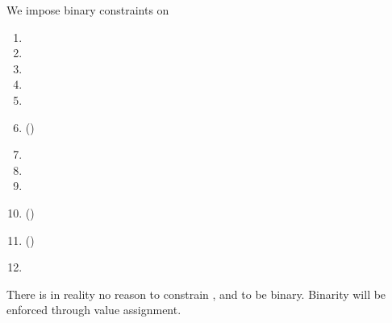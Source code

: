 We impose binary constraints on
\begin{multicols}{2}
	\begin{enumerate}
		\item \txIsLegacy{}
		\item \txIsAccessSet{}
		\item \txIsTypeTwo{}
		\item \txIsDeployment{}
		\item \txStatusCode{}
		\item \txCopyTxcd{} \quad (\trash)
		\item \txRequiresEvmExecution{}
		\item \eucFlag{}
		\item \wcpFlag{}
		\item \isLastTxOfBlock{} \quad (\trash)
		\item \txFirstTransactionInBlock{} \quad (\trash)
		\item[\vspace{\fill}]
	\end{enumerate}
\end{multicols}
\saNote{}
There is in reality no reason to constrain
\txCopyTxcd{},
\isLastTxOfBlock{} and
\txFirstTransactionInBlock{}
to be binary.
Binarity will be enforced through value assignment.
